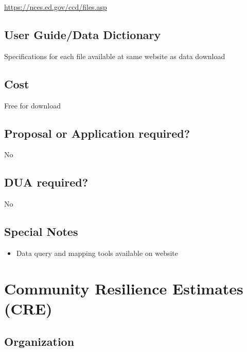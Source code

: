 \documentclass[
]{book}
\providecommand{\tightlist}{%
  \setlength{\itemsep}{0pt}\setlength{\parskip}{0pt}}
\begin{document}
\url{https://nces.ed.gov/ccd/files.asp}

\hypertarget{user-guidedata-dictionary-17}{%
\section{User Guide/Data Dictionary}\label{user-guidedata-dictionary-17}}

Specifications for each file available at same website as data download

\hypertarget{cost-17}{%
\section{Cost}\label{cost-17}}

Free for download

\hypertarget{proposal-or-application-required-17}{%
\section{Proposal or Application required?}\label{proposal-or-application-required-17}}

No

\hypertarget{dua-required-17}{%
\section{DUA required?}\label{dua-required-17}}

No

\hypertarget{special-notes-17}{%
\section{Special Notes}\label{special-notes-17}}

\begin{itemize}
\tightlist
\item
  Data query and mapping tools available on website
\end{itemize}

\mainmatter

\hypertarget{community-resilience-estimates-cre}{%
\chapter{Community Resilience Estimates (CRE)}\label{community-resilience-estimates-cre}}

\hypertarget{organization-18}{%
\section{Organization}\label{organization-18}}
\end{document}
